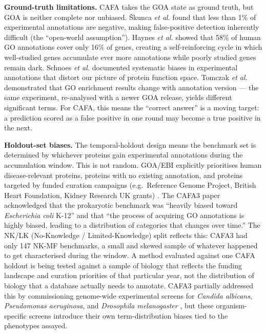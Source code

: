 \documentclass[
  11pt,
]{article}
\begin{document}
\textbf{Ground-truth limitations.} CAFA takes the GOA state as ground
truth, but GOA is neither complete nor unbiased. Škunca \emph{et al.}
\cite{skunca2012} found that less than 1\% of experimental annotations are
negative, making false-positive detection inherently difficult (the
``open-world assumption''). Haynes \emph{et al.} \cite{haynes2018} showed that
58\% of human GO annotations cover only 16\% of genes, creating a
self-reinforcing cycle in which well-studied genes accumulate ever more
annotations while poorly studied genes remain dark. Schnoes \emph{et
al.} \cite{schnoes2013} documented systematic biases in experimental annotations
that distort our picture of protein function space. Tomczak \emph{et
al.} \cite{tomczak2018} demonstrated that GO enrichment results change with
annotation version --- the same experiment, re-analysed with a newer GOA
release, yields different significant terms. For CAFA, this means the
``correct answer'' is a moving target: a prediction scored as a false
positive in one round may become a true positive in the next.

\textbf{Holdout-set biases.} The temporal-holdout design means the
benchmark set is determined by whichever proteins gain experimental
annotations during the accumulation window. This is not random. GOA/EBI
explicitly prioritises human disease-relevant proteins, proteins with no
existing annotation, and proteins targeted by funded curation campaigns
(e.g.~Reference Genome Project, British Heart Foundation, Kidney
Research UK grants) \cite{uniprotgoa2026}. The CAFA3 paper \cite{zhou2019} acknowledged that
the prokaryotic benchmark was ``heavily biased toward \emph{Escherichia
coli} K-12'' and that ``the process of acquiring GO annotations is
highly biased, leading to a distribution of categories that changes over
time.'' The NK/LK (No-Knowledge / Limited-Knowledge) split reflects
this: CAFA3 had only 147 NK-MF benchmarks, a small and skewed sample of
whatever happened to get characterised during the window. A method
evaluated against one CAFA holdout is being tested against a sample of
biology that reflects the funding landscape and curation priorities of
that particular year, not the distribution of biology that a database
actually needs to annotate. CAFA3 partially addressed this by
commissioning genome-wide experimental screens for \emph{Candida
albicans}, \emph{Pseudomonas aeruginosa}, and \emph{Drosophila
melanogaster} \cite{zhou2019}, but these organism-specific screens introduce
their own term-distribution biases tied to the phenotypes assayed.
\end{document}

